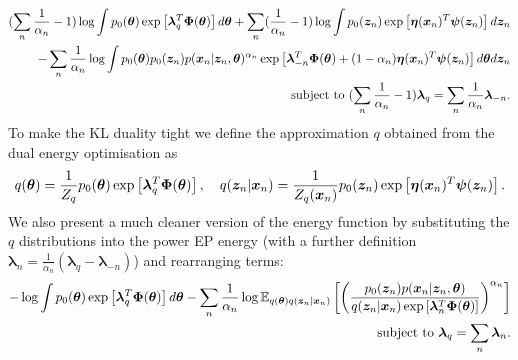 \begin{equation}
\begin{aligned}
(\sum_n \frac{1}{\alpha_n} - 1) \log \int p_0(\bm{\theta}) \exp \left[ \bm{\lambda}_q^T \bm{\Phi}(\bm{\theta}) \right] d \bm{\theta} + \sum_n (\frac{1}{\alpha_n} - 1) \log \int p_0(\bm{z}_n) \exp \left[ \bm{\eta}(\bm{x}_n)^T \bm{\psi}(\bm{z}_n) \right] d \bm{z}_n \\
- \sum_n \frac{1}{\alpha_n} \log \int p_0(\bm{\theta}) p_0(\bm{z}_n) p( \bm{x}_n | \bm{z}_n, \bm{\theta})^{\alpha_n} \exp \left[ \bm{\lambda}_{-n}^T \bm{\Phi}(\bm{\theta}) + (1 - \alpha_n) \bm{\eta}(\bm{x}_n)^T \bm{\psi}(\bm{z}_n) \right] d \bm{\theta} d \bm{z}_n \\
\text{subject to } (\sum_n \frac{1}{\alpha_n} - 1) \bm{\lambda}_q = \sum_n \frac{1}{\alpha_n} \bm{\lambda}_{-n}.
\end{aligned}
\end{equation}
To make the KL duality tight we define the approximation $q$ obtained from the dual energy optimisation as
\begin{equation*}
q(\bm{\theta}) = \frac{1}{Z_q} p_0(\bm{\theta}) \exp \left[ \bm{\lambda}_q^T \bm{\Phi}(\bm{\theta}) \right], \quad
q(\bm{z}_n|\bm{x}_n) = \frac{1}{Z_q(\bm{x}_n)} p_0(\bm{z}_n) \exp \left[ \bm{\eta}(\bm{x}_n)^T \bm{\psi}(\bm{z}_n) \right].
\end{equation*}
%
We also present a much cleaner version of the energy function by substituting the $q$ distributions into the power EP energy (with a further definition $\bm{\lambda}_n = \frac{1}{\alpha_n}(\bm{\lambda}_q - \bm{\lambda}_{-n})$) and rearranging terms:
\begin{equation}
\begin{aligned}
- \log \int p_0(\bm{\theta}) \exp \left[ \bm{\lambda}_q^T \bm{\Phi}(\bm{\theta}) \right] d \bm{\theta}
- \sum_n \frac{1}{\alpha_n} \log \mathbb{E}_{q(\bm{\theta}) q(\bm{z}_n|\bm{x}_n)} \left[ \left( \frac{p_0(\bm{z}_n) p( \bm{x}_n | \bm{z}_n, \bm{\theta})}{q(\bm{z}_n|\bm{x}_n) \exp \left[ \bm{\lambda}_{n}^T \bm{\Phi}(\bm{\theta}) \right] } \right)^{\alpha_n} \right] \\
\text{subject to } \bm{\lambda}_q = \sum_n \bm{\lambda}_{n}.
\end{aligned}
\label{eq:ep_energy_lvm}
\end{equation}
%

